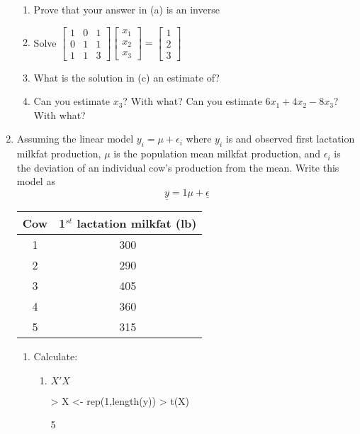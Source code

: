 \documentclass[12pt,a4paper]{paper}
\begin{document}
\begin{enumerate}
\begin{enumerate}
\item Prove that your answer in (a) is an inverse
\item Solve $\left[\begin{array}{ccc}1&0&1\\0&1&1\\1&1&3\end{array}\right]\left[\begin{array}{c}x_1\\x_2\\x_3\end{array}\right]=\left[\begin{array}{c}1\\2\\3\end{array}\right]$
\item What is the solution in (c) an estimate of?
\item Can you estimate $x_{3}$? With what? Can you estimate $6x_{1} + 4x_{2} - 8x_{3}$? With what?
\end{enumerate}
\item Assuming the linear model $y_{i} = \mu + \epsilon_{i}$ where $y_{i}$ is and observed first lactation milkfat production, $\mu$ is the population mean milkfat production, and $\epsilon_{i}$ is the deviation of an individual cow's production from the mean. Write this model as \[\underline{y} = 1\mu + \underline{\epsilon}\]
\begin{center}
\begin{tabular}{|c|c|}
\hline
Cow & 1$^{st}$ lactation milkfat (lb)\\
\hline\hline
1&300\\
\hline
2&290\\
\hline
3&405\\
\hline
4&360\\
\hline
5&315\\
\hline
\end{tabular}
\end{center}
\begin{enumerate}
\item Calculate:
\begin{enumerate}
\item $X'X$
\begin{Schunk}
\begin{Sinput}
> X <- rep(1,length(y))
> t(X) %*% X
\end{Sinput}
\begin{Soutput}
     [,1]
[1,]    5
\end{Soutput}
\end{Schunk}

\end{enumerate}
\end{enumerate}
\end{enumerate}
\end{document}
